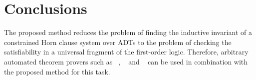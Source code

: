 \section{Conclusions}\label{sec:fmf/conclusion}
The proposed method reduces the problem of finding the inductive invariant of a constrained Horn clause system over ADTs to the problem of checking the satisfiability in a universal fragment of the first-order logic.
Therefore, arbitrary automated theorem provers such as \vampire{}~\cite{kovacs2013first}, \eprover{}~\cite{10.5555/1218615.1218621} and \zipperposition{}~\cite{10.1007/978-3-319-66167-4_10} can be used in combination with the proposed method for this task.
